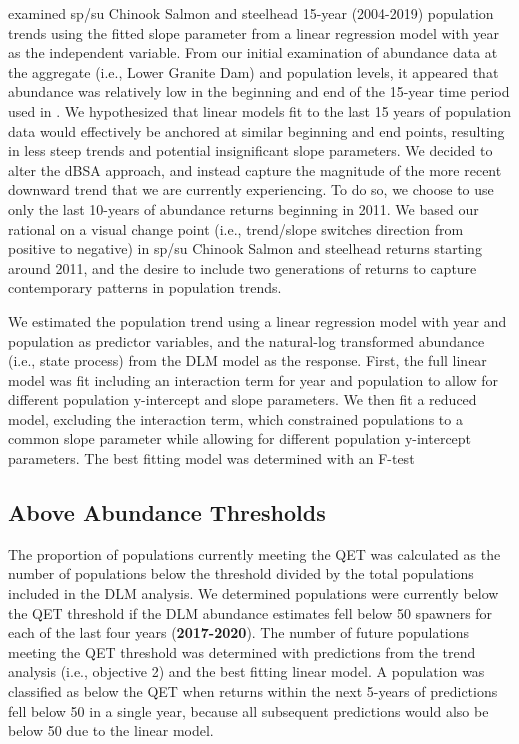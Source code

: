 \documentclass[10pt,a4paper]{article}
\begin{document}
\textcite{ford_biological_2022} examined sp/su Chinook Salmon and steelhead 15-year (2004-2019) population trends using the fitted slope parameter from a linear regression model with year as the independent variable. From our initial examination of abundance data at the aggregate (i.e., Lower Granite Dam) and population levels, it appeared that abundance was relatively low in the beginning and end of the 15-year time period used in \textcite{ford_biological_2022}. We hypothesized that linear models fit to the last 15 years of population data would effectively be anchored at similar beginning and end points, resulting in less steep trends and potential insignificant slope parameters. We decided to alter the dBSA approach, and instead capture the magnitude of the more recent downward trend that we are currently experiencing. To do so, we choose to use only the last 10-years of abundance returns beginning in 2011. We based our rational on a visual change point (i.e., trend/slope switches direction from positive to negative) in sp/su Chinook Salmon and steelhead returns starting around 2011, and the desire to include two generations of returns to capture contemporary patterns in population trends.

We estimated the population trend using a linear regression model with year and population as predictor variables, and the natural-log transformed abundance (i.e., state process) from the DLM model as the response. First, the full linear model was fit including an interaction term for year and population to allow for different population y-intercept and slope parameters. We then fit a reduced model, excluding the interaction term, which constrained populations to a common slope parameter while allowing for different population y-intercept parameters. The best fitting model was determined with an F-test \autocite{casella_statistical_2021}

\subsection{Above Abundance Thresholds}\label{above-abundance-thresholds}

The proportion of populations currently meeting the QET was calculated as the number of populations below the threshold divided by the total populations included in the DLM analysis. We determined populations were currently below the QET threshold if the DLM abundance estimates fell below 50 spawners for each of the last four years (\textbf{2017-2020}). The number of future populations meeting the QET threshold was determined with predictions from the trend analysis (i.e., objective 2) and the best fitting linear model. A population was classified as below the QET when returns within the next 5-years of predictions fell below 50 in a single year, because all subsequent predictions would also be below 50 due to the linear model.
\end{document}
